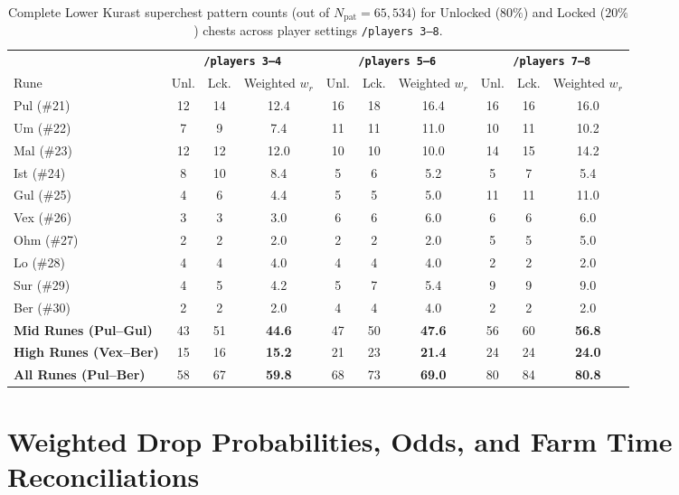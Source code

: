 \documentclass[11pt,reqno]{amsart}
\theoremstyle{definition}
\begin{document}
\begin{table}[htbp]
\centering
\caption{Complete Lower Kurast superchest pattern counts (out of $N_{\text{pat}} = 65{,}534$) for Unlocked ($80\%$) and Locked ($20\%$) chests across player settings \texttt{/players~3--8}.}
\label{tab:app_patterns}
\footnotesize
\setlength{\tabcolsep}{4.5pt}
\begin{tabular}{@{}l ccc ccc ccc@{}}
\toprule
& \multicolumn{3}{c}{\textbf{\texttt{/players 3--4}}} & \multicolumn{3}{c}{\textbf{\texttt{/players 5--6}}} & \multicolumn{3}{c}{\textbf{\texttt{/players 7--8}}} \\
\cmidrule(lr){2-4} \cmidrule(lr){5-7} \cmidrule(lr){8-10}
Rune & Unl. & Lck. & Weighted $w_r$ & Unl. & Lck. & Weighted $w_r$ & Unl. & Lck. & Weighted $w_r$ \\
\midrule
Pul (\#21) & 12 & 14 & 12.4 & 16 & 18 & 16.4 & 16 & 16 & 16.0 \\
Um (\#22)  &  7 &  9 &  7.4 & 11 & 11 & 11.0 & 10 & 11 & 10.2 \\
Mal (\#23) & 12 & 12 & 12.0 & 10 & 10 & 10.0 & 14 & 15 & 14.2 \\
Ist (\#24) &  8 & 10 &  8.4 &  5 &  6 &  5.2 &  5 &  7 &  5.4 \\
Gul (\#25) &  4 &  6 &  4.4 &  5 &  5 &  5.0 & 11 & 11 & 11.0 \\
\midrule
Vex (\#26) &  3 &  3 &  3.0 &  6 &  6 &  6.0 &  6 &  6 &  6.0 \\
Ohm (\#27) &  2 &  2 &  2.0 &  2 &  2 &  2.0 &  5 &  5 &  5.0 \\
Lo (\#28)  &  4 &  4 &  4.0 &  4 &  4 &  4.0 &  2 &  2 &  2.0 \\
Sur (\#29) &  4 &  5 &  4.2 &  5 &  7 &  5.4 &  9 &  9 &  9.0 \\
Ber (\#30) &  2 &  2 &  2.0 &  4 &  4 &  4.0 &  2 &  2 &  2.0 \\
\midrule
\textbf{Mid Runes (Pul--Gul)}   & 43 & 51 & \textbf{44.6} & 47 & 50 & \textbf{47.6} & 56 & 60 & \textbf{56.8} \\
\textbf{High Runes (Vex--Ber)}  & 15 & 16 & \textbf{15.2} & 21 & 23 & \textbf{21.4} & 24 & 24 & \textbf{24.0} \\
\textbf{All Runes (Pul--Ber)}   & 58 & 67 & \textbf{59.8} & 68 & 73 & \textbf{69.0} & 80 & 84 & \textbf{80.8} \\
\bottomrule
\end{tabular}
\end{table}

\section{Weighted Drop Probabilities, Odds, and Farm Time Reconciliations}
\label{app:probabilities}
\end{document}
